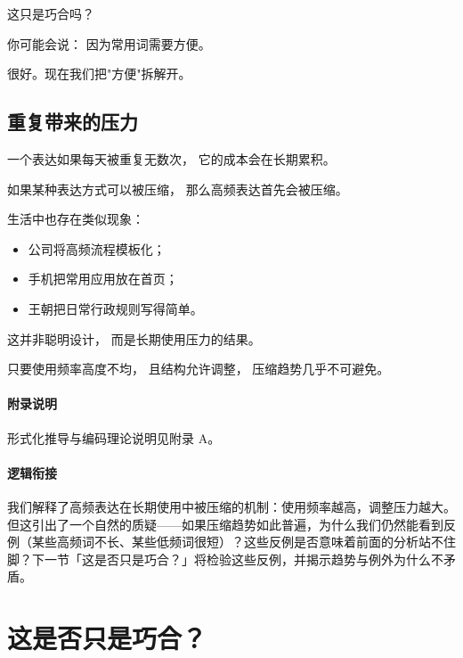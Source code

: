 \documentclass[../main.tex]{subfiles}
\begin{document}
这只是巧合吗？

\begin{tcolorbox}[colback=yellow!5,title=\textit{读者行为预测}]
	你可能会说：
	因为常用词需要方便。

	很好。现在我们把"方便"拆解开。
\end{tcolorbox}

\subsection{重复带来的压力}

一个表达如果每天被重复无数次，
它的成本会在长期累积。

如果某种表达方式可以被压缩，
那么高频表达首先会被压缩。

生活中也存在类似现象：

\begin{itemize}
	\item 公司将高频流程模板化；
	\item 手机把常用应用放在首页；
	\item 王朝把日常行政规则写得简单。
\end{itemize}

这并非聪明设计，
而是长期使用压力的结果。

\begin{readingnote}
	只要使用频率高度不均，
	且结构允许调整，
	压缩趋势几乎不可避免。
\end{readingnote}

\paragraph{附录说明}
形式化推导与编码理论说明见附录 A。

\paragraph*{逻辑衔接}
我们解释了高频表达在长期使用中被压缩的机制：使用频率越高，调整压力越大。但这引出了一个自然的质疑——如果压缩趋势如此普遍，为什么我们仍然能看到反例（某些高频词不长、某些低频词很短）？这些反例是否意味着前面的分析站不住脚？下一节「这是否只是巧合？」将检验这些反例，并揭示趋势与例外为什么不矛盾。


\section{这是否只是巧合？}
\end{document}
